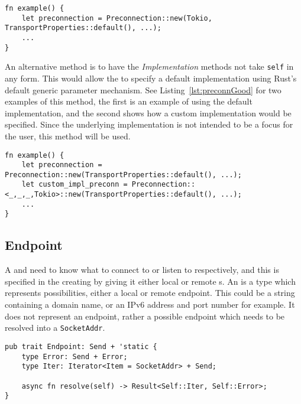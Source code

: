 \begin{lstlisting}[float=h, label=lst:preconnBad, caption={An example of how to construct a
Preconnection if the Implementation trait is to be passed when the Preconnection is constructed}]
fn example() {
    let preconnection = Preconnection::new(Tokio, TransportProperties::default(), ...);
    ...
}
\end{lstlisting}

An alternative method is to have the \emph{Implementation} methods not take \texttt{self} in any form.
This would allow the \preconnection{} to specify a default implementation using Rust's default generic parameter
mechanism.
See Listing~\ref{lst:preconnGood} for two examples of this method, the first \preconnection{} is an example of using
the default implementation, and the second \preconnection{} shows how a custom implementation would be specified.
Since the underlying implementation is not intended to be a focus for the user, this method will be used.

\begin{lstlisting}[float=h, label=lst:preconnGood, caption={An example of how to construct a
Preconnection if the Implementation trait is used as a marker.}]
fn example() {
    let preconnection = Preconnection::new(TransportProperties::default(), ...);
    let custom_impl_preconn = Preconnection::<_,_,_,Tokio>::new(TransportProperties::default(), ...);
    ...
}
\end{lstlisting}

\subsection{Endpoint}\label{subsec:endpoint}
A \connection{} and \listener{} need to know what to connect to or listen to respectively, and this is specified in the
creating \preconnection{} by giving it either local or remote \Endpoint{}s.
An \Endpoint{} is a type which represents possibilities, either a local or remote endpoint.
This could be a string containing a domain name, or an IPv6 address and port number for example.
It does not represent an endpoint, rather a possible endpoint which needs to be resolved into a \texttt{SocketAddr}.

\begin{lstlisting}[float=h, label=lst:endpoint, caption={The Endpoint Trait with the resolve method returning an
        Iterator.}]
pub trait Endpoint: Send + 'static {
    type Error: Send + Error;
    type Iter: Iterator<Item = SocketAddr> + Send;

    async fn resolve(self) -> Result<Self::Iter, Self::Error>;
}
\end{lstlisting}

